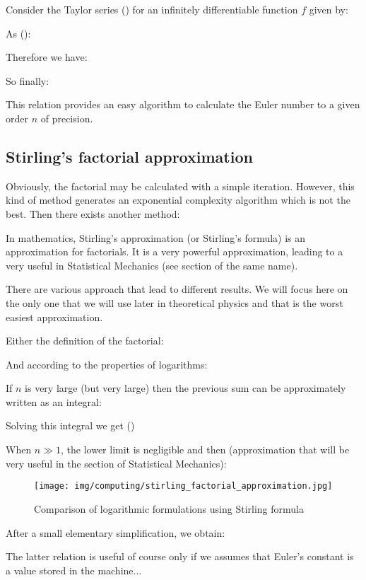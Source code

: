 	Consider the Taylor series () for an infinitely differentiable function $f$ given by:
	
	As ():
	
	Therefore we have:
	
	So finally:
	
	This relation provides an easy algorithm to calculate the Euler number to a given order $n$ of precision.

	\subsection{Stirling's factorial approximation}
	Obviously, the factorial may be calculated with a simple iteration. However, this kind of method generates an exponential complexity algorithm which is not the best. Then there exists another method:

	In mathematics, Stirling's approximation (or Stirling's formula) is an approximation for factorials. It is a very powerful approximation, leading to a very useful in Statistical Mechanics (see section of the same name). 

	There are various approach that lead to different results. We will focus here on the only one that we will use later in theoretical physics and that is the worst easiest approximation.
	
	Either the definition of the factorial:
	
	
	And according to the properties of logarithms:
	
	
	If $n$ is very large (but very large) then the previous sum can be approximately written as an integral:
	
	
	Solving this integral we get ()
	
	
	When $n \gg 1$, the lower limit is negligible and then (approximation that will be very useful in the section of Statistical Mechanics):
	
	\begin{figure}[H]
		\centering
		\texttt{[image: img/computing/stirling\_factorial\_approximation.jpg]}
		\caption{Comparison of logarithmic formulations using Stirling formula}
	\end{figure}
	
	After a small elementary simplification, we obtain:
	
	
	The latter relation is useful of course only if we assumes that Euler's constant is a value stored in the machine...
	
